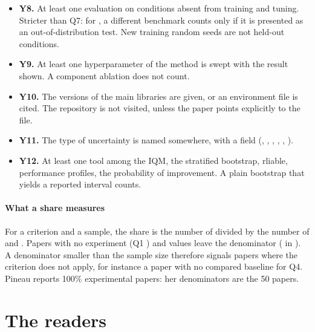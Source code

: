 \begin{itemize}
  \item \textbf{Y8.} At least one evaluation on conditions absent from training and tuning. Stricter
  than Q7: for , a different benchmark counts only if it is presented as an
  out-of-distribution test. New training random seeds are not held-out conditions.
  \item \textbf{Y9.} At least one hyperparameter of the method is swept with the result shown. A
  component ablation does not count.
  \item \textbf{Y10.} The versions of the main libraries are given, or an environment file is cited.
  The repository is not visited, unless the paper points explicitly to the file.
  \item \textbf{Y11.} The type of uncertainty is named somewhere, with a  field
  (, , , , , ).
  \item \textbf{Y12.} At least one tool among the IQM, the stratified bootstrap, rliable, performance
  profiles, the probability of improvement. A plain bootstrap that yields a reported interval counts.
\end{itemize}

\paragraph{What a share measures}
For a criterion and a sample, the share is the number of  divided by the number of
 and . Papers with no experiment (Q1 ) and  values leave the
denominator ( in ). A denominator smaller than the sample
size therefore signals papers where the criterion does not apply, for instance a paper with no compared
baseline for Q4. Pineau reports 100\% experimental papers: her denominators are the 50 papers.

\section{The readers}\label{sec:sm-lecteurs}

